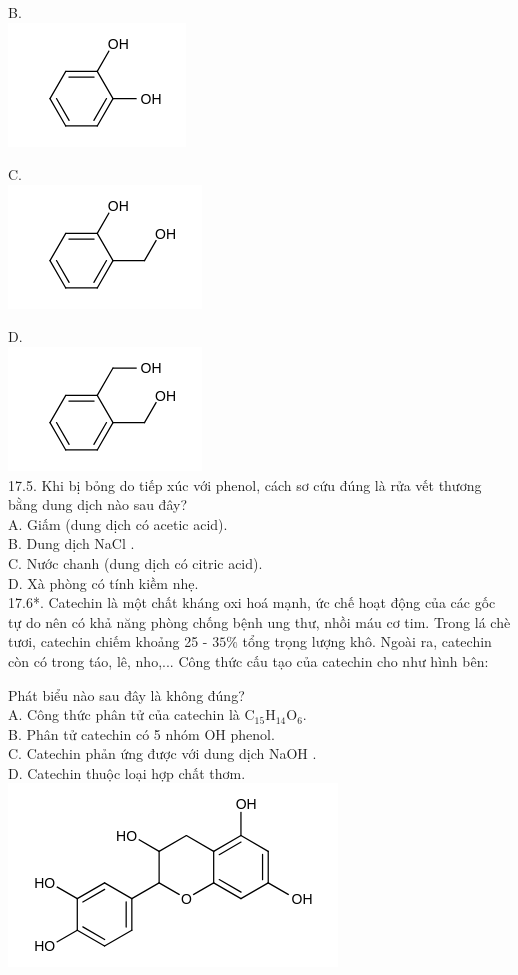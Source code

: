 \documentclass[10pt]{article}
\begin{document}
B.\\
\includegraphics{smile-402c77b4fc450f3211077eb6ce8013536dfe7139}

C.\\
\includegraphics{smile-332d4834176571d23764d9e663f4a7cd9975c6ea}

D.\\
\includegraphics{smile-a9b9107cef532577c370be3ae4e33bc591d0033f}\\
17.5. Khi bị bỏng do tiếp xúc với phenol, cách sơ cứu đúng là rửa vết thương bằng dung dịch nào sau đây?\\
A. Giấm (dung dịch có acetic acid).\\
B. Dung dịch NaCl .\\
C. Nước chanh (dung dịch có citric acid).\\
D. Xà phòng có tính kiềm nhẹ.\\
17.6*. Catechin là một chất kháng oxi hoá mạnh, ức chế hoạt động của các gốc tự do nên có khả năng phòng chống bệnh ung thư, nhồi máu cơ tim. Trong lá chè tươi, catechin chiếm khoảng 25 - $35 \%$ tổng trọng lượng khô. Ngoài ra, catechin còn có trong táo, lê, nho,... Công thức cấu tạo của catechin cho như hình bên:

Phát biểu nào sau đây là không đúng?\\
A. Công thức phân tử của catechin là $\mathrm{C}_{15} \mathrm{H}_{14} \mathrm{O}_{6}$.\\
B. Phân tử catechin có 5 nhóm OH phenol.\\
C. Catechin phản ứng được với dung dịch NaOH .\\
D. Catechin thuộc loại hợp chất thơm.\\
\includegraphics{smile-37645aa09fcdbba61db08bcf4cf3b179cc663474}
\end{document}
